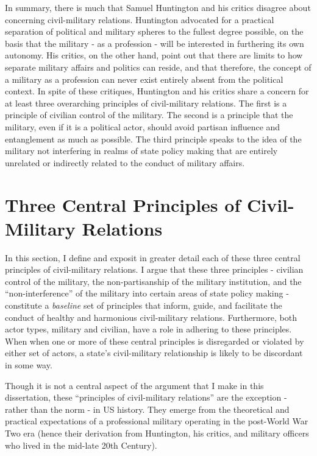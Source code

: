 \documentclass[
  12pt,
  oneside]{memoir}
\begin{document}
In summary, there is much that Samuel Huntington and his critics disagree about concerning civil-military relations. Huntington advocated for a practical separation of political and military spheres to the fullest degree possible, on the basis that the military - as a profession - will be interested in furthering its own autonomy. His critics, on the other hand, point out that there are limits to how separate military affairs and politics can reside, and that therefore, the concept of a military as a profession can never exist entirely absent from the political context. In spite of these critiques, Huntington and his critics share a concern for at least three overarching principles of civil-military relations. The first is a principle of civilian control of the military. The second is a principle that the military, even if it is a political actor, should avoid partisan influence and entanglement as much as possible. The third principle speaks to the idea of the military not interfering in realms of state policy making that are entirely unrelated or indirectly related to the conduct of military affairs.

\hypertarget{three-central-principles-of-civil-military-relations}{%
\chapter{Three Central Principles of Civil-Military Relations}\label{three-central-principles-of-civil-military-relations}}

In this section, I define and exposit in greater detail each of these three central principles of civil-military relations. I argue that these three principles - civilian control of the military, the non-partisanship of the military institution, and the ``non-interference'' of the military into certain areas of state policy making - constitute a \emph{baseline} set of principles that inform, guide, and facilitate the conduct of healthy and harmonious civil-military relations. Furthermore, both actor types, military and civilian, have a role in adhering to these principles. When when one or more of these central principles is disregarded or violated by either set of actors, a state's civil-military relationship is likely to be discordant in some way.

Though it is not a central aspect of the argument that I make in this dissertation, these ``principles of civil-military relations'' are the exception - rather than the norm - in US history. They emerge from the theoretical and practical expectations of a professional military operating in the post-World War Two era (hence their derivation from Huntington, his critics, and military officers who lived in the mid-late 20th Century).
\end{document}
